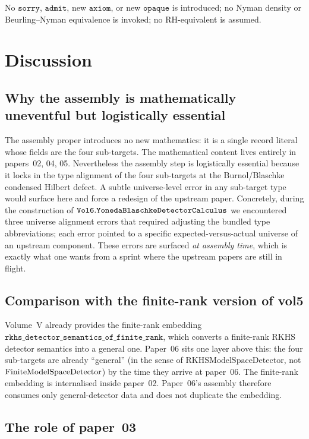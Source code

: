 \documentclass[12pt]{article}
\theoremstyle{plain}
\theoremstyle{definition}
\theoremstyle{remark}
\begin{document}
No \(\mathtt{sorry}\), \(\mathtt{admit}\), new \(\mathtt{axiom}\), or
new \(\mathtt{opaque}\) is introduced; no Nyman density or
Beurling--Nyman equivalence is invoked; no RH-equivalent is assumed.

\section{Discussion}
\label{sec:discussion}

\subsection{Why the assembly is mathematically uneventful but logistically essential}

The assembly proper introduces no new mathematics: it is a single
record literal whose fields are the four sub-targets. The mathematical
content lives entirely in papers~02, 04, 05. Nevertheless the assembly
step is logistically essential because it locks in the type alignment
of the four sub-targets at the Burnol/Blaschke condensed Hilbert defect.
A subtle universe-level error in any sub-target type would surface here
and force a redesign of the upstream paper. Concretely, during the
construction of \(\mathtt{Vol6.Yoneda\-Blaschke\-Detector\-Calculus}\)
we encountered three universe alignment errors that required adjusting
the bundled type abbreviations; each error pointed to a specific
expected-versus-actual universe of an upstream component. These errors
are surfaced \emph{at assembly time}, which is exactly what one wants
from a sprint where the upstream papers are still in flight.

\subsection{Comparison with the finite-rank version of vol5}

Volume~V already provides the finite-rank embedding
\(\mathtt{rkhs\_detector\_semantics\_of\_finite\_rank}\), which converts
a finite-rank RKHS detector semantics into a general one. Paper~06
sits one layer above this: the four sub-targets are already
``general'' (in the sense of \(\mathrm{RKHSModelSpaceDetector}\), not
\(\mathrm{Finite\-Model\-Space\-Detector}\)) by the time they arrive
at paper~06. The finite-rank embedding is internalised inside paper~02.
Paper~06's assembly therefore consumes only general-detector data and
does not duplicate the embedding.

\subsection{The role of paper~03}
\end{document}
